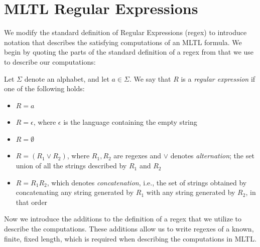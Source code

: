 \documentclass[runningheads]{llncs}
\begin{document}

\section{MLTL Regular Expressions} \label{regex}
We modify the standard definition of Regular Expressions (regex) to introduce notation that describes the satisfying computations of an MLTL formula. We begin by quoting the parts of the standard definition of a regex from \cite{sipser} that we use to describe our computations:

\begin{definition} \label{sipser regex} 
    Let $\Sigma$ denote an alphabet, and let $a\in \Sigma$. We say that $R$ is a \emph{regular expression} if one of the following holds:
    \begin{itemize}
        \item $R = a$
        \item $R = \epsilon$, where $\epsilon$ is the language containing the empty string
        \item $R = \emptyset$
        \item $R = (R_1 \lor R_2)$, where $R_1, R_2$ are regexes and $\lor$ denotes \emph{alternation}; the set union of all the strings described by $R_1$ and $R_2$
        \item $R = R_1R_2$, which denotes \emph{concatenation}, i.e., the set of strings obtained by concatenating any string generated by $R_1$ with any string generated by $R_2$, in that order
    \end{itemize}
\end{definition}
Now we introduce the additions to the definition of a regex that we utilize to describe the computations. These additions allow us to write regexes of a known, finite, fixed length, which is required when describing the computations in MLTL. 
\end{document}
